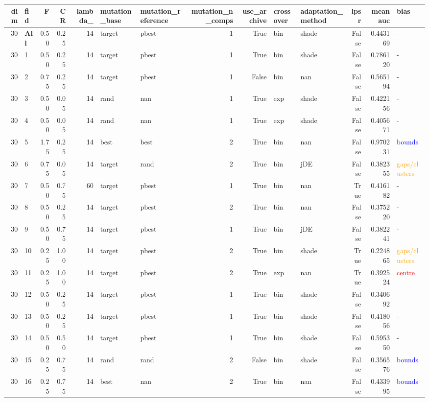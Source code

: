 \begin{tabular}{rlrrrllrrllrrl}
\toprule
dim & fid & F & CR & lambda_ & mutation_base & mutation_reference & mutation_n_comps & use_archive & crossover & adaptation_method & lpsr & mean auc & bias \\
\midrule
30 & \textbf{All} & 0.50 & 0.25 & 14 & target & pbest & 1 & True & bin & shade & False & 0.443169 & - \\
30 & 1 & 0.50 & 0.25 & 14 & target & pbest & 1 & True & bin & shade & False & 0.786120 & - \\
30 & 2 & 0.75 & 0.25 & 14 & target & pbest & 1 & False & bin & nan & False & 0.565194 & - \\
30 & 3 & 0.50 & 0.05 & 14 & rand & nan & 1 & True & exp & shade & False & 0.422156 & - \\
30 & 4 & 0.50 & 0.05 & 14 & rand & nan & 1 & True & exp & shade & False & 0.405671 & - \\
30 & 5 & 1.75 & 0.25 & 14 & best & best & 2 & True & bin & nan & False & 0.970231 & \textcolor{blue}{bounds} \\
30 & 6 & 0.75 & 0.05 & 14 & target & rand & 2 & True & bin & jDE & False & 0.382355 & \textcolor{orange}{gaps/clusters} \\
30 & 7 & 0.50 & 0.75 & 60 & target & pbest & 1 & True & bin & nan & True & 0.416182 & - \\
30 & 8 & 0.50 & 0.25 & 14 & target & pbest & 2 & True & bin & nan & False & 0.375220 & - \\
30 & 9 & 0.50 & 0.75 & 14 & target & pbest & 1 & True & bin & jDE & False & 0.382241 & - \\
30 & 10 & 0.25 & 1.00 & 14 & target & pbest & 2 & True & bin & shade & True & 0.224865 & \textcolor{orange}{gaps/clusters} \\
30 & 11 & 0.25 & 1.00 & 14 & target & pbest & 2 & True & exp & nan & True & 0.392524 & \textcolor{red}{centre} \\
30 & 12 & 0.50 & 0.25 & 14 & target & pbest & 1 & True & bin & shade & False & 0.340692 & - \\
30 & 13 & 0.50 & 0.25 & 14 & target & pbest & 1 & True & bin & shade & False & 0.418056 & - \\
30 & 14 & 0.50 & 0.50 & 14 & target & pbest & 1 & True & bin & shade & False & 0.595350 & - \\
30 & 15 & 0.25 & 0.75 & 14 & rand & rand & 2 & False & bin & shade & False & 0.356576 & \textcolor{blue}{bounds} \\
30 & 16 & 0.25 & 0.75 & 14 & best & nan & 2 & True & bin & nan & False & 0.433995 & \textcolor{blue}{bounds} \\

\end{tabular}

